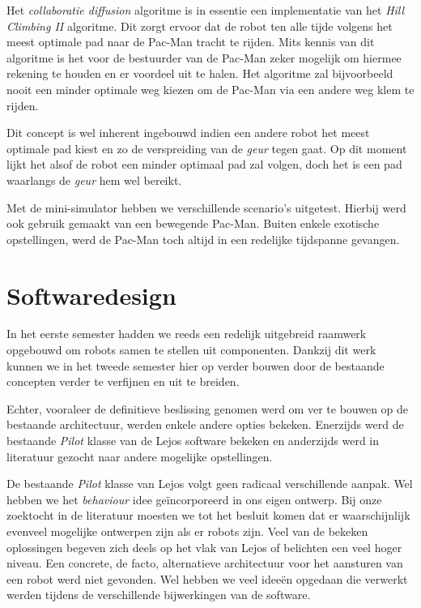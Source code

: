 \documentclass[12pt,a4paper]{report}
\begin{document}
Het \emph{collaboratie diffusion} algoritme is in essentie een implementatie van het \emph{Hill Climbing II} algoritme. Dit zorgt ervoor dat de robot ten alle tijde volgens het meest optimale pad naar de Pac-Man tracht te rijden. Mits kennis van dit algoritme is het voor de bestuurder van de Pac-Man zeker mogelijk om hiermee rekening te houden en er voordeel uit te halen. Het algoritme zal bijvoorbeeld nooit een minder optimale weg kiezen om de Pac-Man via een andere weg klem te rijden.

Dit concept is wel inherent ingebouwd indien een andere robot het meest optimale pad kiest en zo de verspreiding van de \emph{geur} tegen gaat. Op dit moment lijkt het alsof de robot een minder optimaal pad zal volgen, doch het is een pad waarlangs de \emph{geur} hem wel bereikt.

Met de mini-simulator hebben we verschillende scenario's uitgetest. Hierbij werd ook gebruik gemaakt van een bewegende Pac-Man. Buiten enkele exotische opstellingen, werd de Pac-Man toch altijd in een redelijke tijdspanne gevangen.

\chapter{Softwaredesign}

In het eerste semester hadden we reeds een redelijk uitgebreid raamwerk opgebouwd om robots samen te stellen uit componenten. Dankzij dit werk kunnen we in het tweede semester hier op verder bouwen door de bestaande concepten verder te verfijnen en uit te breiden.

Echter, vooraleer de definitieve beslissing genomen werd om ver te bouwen op de bestaande architectuur, werden enkele andere opties bekeken. Enerzijds werd de bestaande \emph{Pilot} klasse van de Lejos software bekeken en anderzijds werd in literatuur gezocht naar andere mogelijke opstellingen.

De bestaande \emph{Pilot} klasse van Lejos volgt geen radicaal verschillende aanpak. Wel hebben we het \emph{behaviour} idee ge\"incorporeerd in ons eigen ontwerp. Bij onze zoektocht in de literatuur moesten we tot het besluit komen dat er waarschijnlijk evenveel mogelijke ontwerpen zijn als er robots zijn. Veel van de bekeken oplossingen begeven zich deels op het vlak van Lejos of belichten een veel hoger niveau. Een concrete, de facto, alternatieve architectuur voor het aansturen van een robot werd niet gevonden. Wel hebben we veel idee\"en opgedaan die verwerkt werden tijdens de verschillende bijwerkingen van de software.
\end{document}
